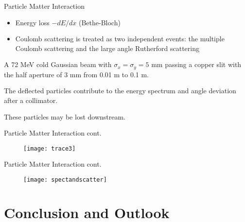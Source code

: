 \documentclass[xcolor=pdftex,table,10pt,yellow,mathserif]{beamer}
\begin{document}
\begin{frame}{Particle Matter Interaction}{}
 \begin{itemize}
 \item Energy loss $-dE/dx$ (Bethe-Bloch)
 \item Coulomb scattering is treated as two independent events: the multiple Coulomb scattering and the large angle Rutherford scattering
 \end{itemize}

A 72 MeV cold Gaussian beam with $\sigma_x=\sigma_y=5$ mm passing a copper slit with the half aperture of $3$ mm from 0.01 m to 0.1 m. 

The deflected particles contribute to the energy spectrum and angle deviation after a collimator. 

These particles may be lost downstream.
\end{frame}

\begin{frame}{Particle Matter Interaction cont.}{}
\begin{figure}[htb]
   \centering
  \texttt{[image: trace3]}
\end{figure}
\end{frame}


\begin{frame}{Particle Matter Interaction cont.}{}
 
\begin{figure}[htb]
   \centering
  \texttt{[image: spectandscatter]}
 \end{figure}

\end{frame}














\section{Conclusion and Outlook}

%
\end{document}
